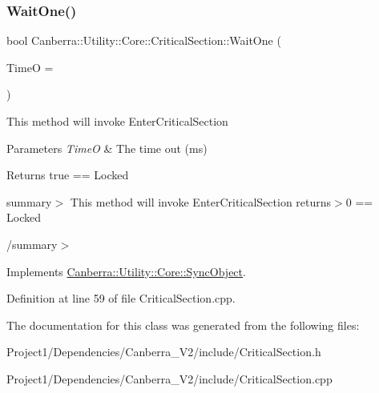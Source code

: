 \subsubsection{\texorpdfstring{Wait\+One()}{WaitOne()}}
{\footnotesize\ttfamily bool Canberra\+::\+Utility\+::\+Core\+::\+Critical\+Section\+::\+Wait\+One (\begin{DoxyParamCaption}\item[{L\+O\+NG}]{TimeO = {} }\end{DoxyParamCaption})\hspace{0.3cm}{\ttfamily [virtual]}}



This method will invoke Enter\+Critical\+Section 


\begin{DoxyParams}{Parameters}
{\em TimeO} & The time out (ms)\\
\hline
\end{DoxyParams}
\begin{DoxyReturn}{Returns}
true == Locked
\end{DoxyReturn}
summary$>$ This method will invoke Enter\+Critical\+Section returns$>$0 == Locked

/summary$>$ 

Implements \hyperlink{class_canberra_1_1_utility_1_1_core_1_1_sync_object}{Canberra\+::\+Utility\+::\+Core\+::\+Sync\+Object}.



Definition at line 59 of file Critical\+Section.\+cpp.



The documentation for this class was generated from the following files\+:\begin{DoxyCompactItemize}
\item 
Project1/\+Dependencies/\+Canberra\+\_\+\+V2/include/Critical\+Section.\+h\item 
Project1/\+Dependencies/\+Canberra\+\_\+\+V2/include/Critical\+Section.\+cpp\end{DoxyCompactItemize}
